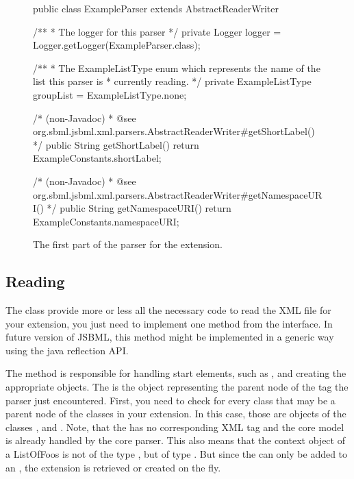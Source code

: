 \begin{figure}[htb]
  \begin{example}[numbers=left]
public class ExampleParser extends AbstractReaderWriter {

  /**
   * The logger for this parser
   */
  private Logger logger = Logger.getLogger(ExampleParser.class);

  /**
   * The ExampleListType enum which represents the name of the list this parser is
   * currently reading.
   */
  private ExampleListType groupList = ExampleListType.none;

  /* (non-Javadoc)
   * @see org.sbml.jsbml.xml.parsers.AbstractReaderWriter#getShortLabel()
   */
  public String getShortLabel() {
    return ExampleConstants.shortLabel;
  }

  /* (non-Javadoc)
   * @see org.sbml.jsbml.xml.parsers.AbstractReaderWriter#getNamespaceURI()
   */
  public String getNamespaceURI() {
    return ExampleConstants.namespaceURI;
  }

}\end{example}
 \caption{The first part of the parser for the extension.}
 \label{lst:ModelExtParserClass}
\end{figure}


\subsection{Reading}

The class  provide more or less all the necessary
code to read the XML file for your extension, you just need to implement one
method from the  interface. In future version of JSBML, this method
might be implemented in a generic way using the java reflection API.

The  method is responsible for handling start
elements, such as , and creating the appropriate
objects.  The  is the object representing the parent
node of the tag the parser just encountered.  First, you need to check for
every class that may be a parent node of the classes in your extension.  In
this case, those are objects of the classes \Model,  and
.  Note, that the  has no corresponding XML
tag and the core model is already handled by the core parser.  This also
means that the context object of a ListOfFoos is not of the type
, but of type \Model.  But since the 
can only be added to an , the extension is retrieved or
created on the fly.

